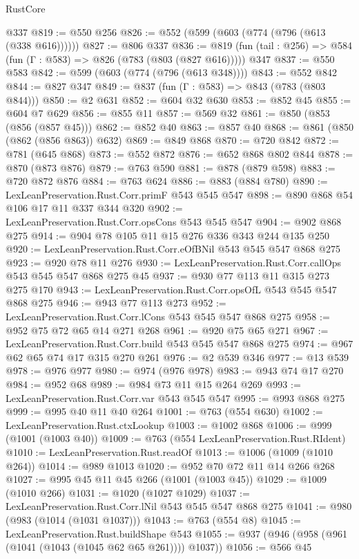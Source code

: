 \begin{lexlean}{RustCore}
\begin{coremodule}
    @337
@819 := @550 @256
@826 := @552 (@599 (@603 (@774 (@796 (@613 (@338 @616))))))
@827 := @806 @337
@836 := @819 (fun (tail : @256) => @584 (fun (Γ : @583) => @826 (@783 (@803 (@827 @616))))) @347
@837 := @550 @583
@842 := @599 (@603 (@774 (@796 (@613 @348))))
@843 := @552 @842
@844 := @827 @347
@849 := @837 (fun (Γ : @583) => @843 (@783 (@803 @844)))
@850 := @2 @631
@852 := @604 @32 @630
@853 := @852 @45
@855 := @604 @7 @629
@856 := @855 @11
@857 := @569 @32
@861 := @850 (@853 (@856 (@857 @45)))
@862 := @852 @40
@863 := @857 @40
@868 := @861 (@850 (@862 (@856 @863)) @632)
@869 := @849 @868
@870 := @720 @842
@872 := @781 (@645 @868)
@873 := @552 @872
@876 := @652 @868 @802 @844
@878 := @870 (@873 @876)
@879 := @763 @590
@881 := @878 (@879 @598)
@883 := @720 @872 @876
@884 := @763 @624
@886 := @883 (@884 @780)
@890 := LexLeanPreservation.Rust.Corr.primF @543 @545 @547
@898 := @890 @868 @54 @106 @17 @11 @337 @344 @320
@902 := LexLeanPreservation.Rust.Corr.opsCons @543 @545 @547
@904 := @902 @868 @275
@914 := @904 @78 @105 @11 @15 @276 @336 @343 @244 @135 @250
@920 := LexLeanPreservation.Rust.Corr.eOfBNil @543 @545 @547 @868 @275
@923 := @920 @78 @11 @276
@930 := LexLeanPreservation.Rust.Corr.callOps @543 @545 @547 @868 @275 @45
@937 := @930 @77 @113 @11 @315 @273 @275 @170
@943 := LexLeanPreservation.Rust.Corr.opsOfL @543 @545 @547 @868 @275
@946 := @943 @77 @113 @273
@952 := LexLeanPreservation.Rust.Corr.lCons @543 @545 @547 @868 @275
@958 := @952 @75 @72 @65 @14 @271 @268
@961 := @920 @75 @65 @271
@967 := LexLeanPreservation.Rust.Corr.build @543 @545 @547 @868 @275
@974 := @967 @62 @65 @74 @17 @315 @270 @261
@976 := @2 @539 @346
@977 := @13 @539
@978 := @976 @977
@980 := @974 (@976 @978)
@983 := @943 @74 @17 @270
@984 := @952 @68
@989 := @984 @73 @11 @15 @264 @269
@993 := LexLeanPreservation.Rust.Corr.var @543 @545 @547
@995 := @993 @868 @275
@999 := @995 @40 @11 @40 @264
@1001 := @763 (@554 @630)
@1002 := LexLeanPreservation.Rust.ctxLookup
@1003 := @1002 @868
@1006 := @999 (@1001 (@1003 @40))
@1009 := @763 (@554 LexLeanPreservation.Rust.RIdent)
@1010 := LexLeanPreservation.Rust.readOf
@1013 := @1006 (@1009 (@1010 @264))
@1014 := @989 @1013
@1020 := @952 @70 @72 @11 @14 @266 @268
@1027 := @995 @45 @11 @45 @266 (@1001 (@1003 @45))
@1029 := @1009 (@1010 @266)
@1031 := @1020 (@1027 @1029)
@1037 := LexLeanPreservation.Rust.Corr.lNil @543 @545 @547 @868 @275
@1041 := @980 (@983 (@1014 (@1031 @1037)))
@1043 := @763 (@554 @8)
@1045 := LexLeanPreservation.Rust.buildShape @543
@1055 := @937 (@946 (@958 (@961 (@1041 (@1043 (@1045 @62 @65 @261)))) @1037))
@1056 := @566 @45

\end{coremodule}
\end{lexlean}
